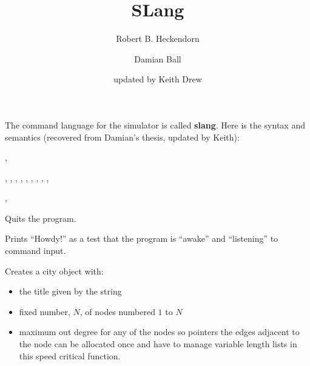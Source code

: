 \documentclass[11pt]{article}
\begin{document}
\title{SLang}
\author{Robert B. Heckendorn
  \and
Damian Ball 
  \and 
updated by Keith Drew}
\maketitle

The command language for the simulator is called \textbf{slang}.  Here is the
syntax and semantics (recovered from Damian's thesis, updated by Keith):

\begin{enumerate}
\production {} \arr {}

\production {} \arr {}  \sep {}

\production {} \arr {} \sep {} \sep {} \sep {} \sep {} \sep  {} \sep {} \sep {} \sep {} \sep {}

\production {} \arr {} \sep {}

Quits the program.

\production {} \arr {}

Prints ``Howdy!'' as a test that the program is ``awake'' and ``listening'' to command input.

\production {} \arr {}   

Creates a city object with:
\begin{itemize}
\item the title given by the string 
\item fixed number, $N$, of nodes numbered $1$ to $N$
\item maximum out degree for any of the nodes so pointers the edges adjacent to the node can be
allocated once and have to manage variable length lists in this speed critical function.
\end{itemize}

\production {} \arr {}       \\



\end{enumerate}
\end{document}
